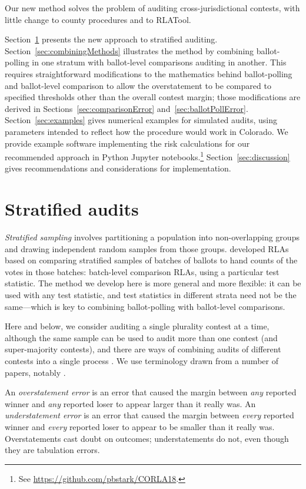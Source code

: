 \documentclass[runningheads]{llncs}
\begin{document}
Our new method solves the problem of auditing cross-jurisdictional contests, with little change to county procedures and to RLATool. 

Section~\ref{sec:stratified} presents the new approach to stratified auditing.
Section~\ref{sec:combiningMethods} illustrates the method by combining ballot-polling in one stratum with ballot-level comparisons auditing in another.
This requires straightforward modifications to the mathematics behind ballot-polling and ballot-level comparison to allow the overstatement to be compared to specified thresholds other than the overall contest margin; those modifications are derived in Sections~\ref{sec:comparisonError} and~\ref{sec:ballotPollError}.
Section~\ref{sec:examples} gives numerical examples for simulated audits, using parameters intended to reflect how the procedure would work in Colorado.
We provide example software implementing the risk calculations for
our recommended approach in Python Jupyter notebooks.\footnote{%
 See \url{https://github.com/pbstark/CORLA18}.
}
Section~\ref{sec:discussion} gives recommendations and
considerations for implementation.


\section{Stratified audits} \label{sec:stratified}

\emph{Stratified sampling} involves partitioning a population
into non-overlapping groups and drawing independent random samples from those groups.
\cite{stark08a,higginsEtal11} developed RLAs based on comparing stratified samples of batches of ballots to hand counts of the votes in those batches: batch-level comparison RLAs, using a particular test statistic.
The method we develop here is more general and more flexible: it can be used with any test statistic, and test statistics in different strata need not be the same---which is key to combining ballot-polling with ballot-level comparisons.

Here and below, we consider auditing a single plurality contest at a time, although the same sample can be used to audit more than one contest (and super-majority contests), and there are ways of combining audits of different contests into a single process \cite{stark09c,stark10d}.
We use terminology drawn from a number of papers, notably \cite{lindemanStark12}.

An \emph{overstatement error} is an error that caused the margin between \emph{any} reported
winner and \emph{any} reported loser to appear larger than it really was.
An \emph{understatement error} is an error that caused the margin between \emph{every} reported
winner and \emph{every} reported loser to appear to be smaller than it really was.
Overstatements cast doubt on outcomes; understatements do not, even though they are tabulation errors.
\end{document}
